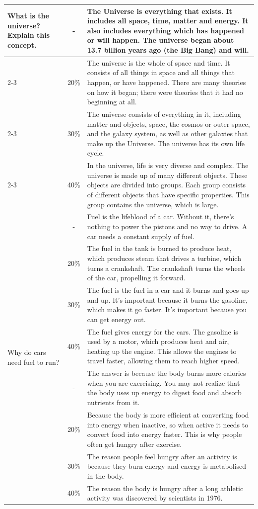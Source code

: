 \begin{table}[ht]
{\begin{tabular}{p{5cm}|c|p{8cm}}
\multirow{14}{=}{What is the universe? Explain this concept.}
& -   & The Universe is everything that exists. It includes all space, time, matter and energy. It also includes everything which has happened or will happen. The universe began about 13.7 billion years ago (the Big Bang) and will. \\
\cmidrule{2-3}
& 20\% & The universe is the whole of space and time. It consists of all things in space and all things that happen, or have happened. There are many theories on how it began; there were theories that it had no beginning at all. \\
\cmidrule{2-3}
& 30\% & The universe consists of everything in it, including matter and objects, space, the cosmos or outer space, and the galaxy system, as well as other galaxies that make up the Universe. The universe has its own life cycle. \\
\cmidrule{2-3}
& 40\% & In the universe, life is very diverse and complex. The universe is made up of many different objects. These objects are divided into groups. Each group consists of different objects that have specific properties. This group contains the universe, which is large. \\
\midrule

\multirow{11}{=}{Why do cars need fuel to run?}
& -   & Fuel is the lifeblood of a car. Without it, there's nothing to power
  the pistons and no way to drive. A car needs a constant supply of fuel. \\
\cmidrule{2-3}
& 20\% &  The fuel in the tank is burned to produce heat, which produces steam that drives a turbine, which turns a crankshaft. The crankshaft turns the wheels of the car, propelling it forward. \\
\cmidrule{2-3}
& 30\% & The fuel is the fuel in a car and it burns and goes up and up. It's important because it burns the gasoline, which makes it go faster. It's important because you can get energy out. \\
\cmidrule{2-3}
& 40\% & The fuel gives energy for the cars. The gasoline is used by a motor, which produces heat and air, heating up the engine. This allows the engines to travel faster, allowing them to reach higher speed. \\
\midrule

\multirow{9}{=}{Why do people feel hungry after exercise?}
& -   &  The answer is because the body burns more calories when you are exercising. You may not realize that the body uses up energy to digest food and absorb nutrients from it.  \\
\cmidrule{2-3}
& 20\% &  Because the body is more efficient at converting food into energy when inactive, so when active it needs to convert food into energy faster. This is why people often get hungry after exercise. \\
\cmidrule{2-3}
& 30\% & The reason people feel hungry after an activity is because they burn energy and energy is metabolised in the body.  \\
\cmidrule{2-3}
& 40\% & The reason the body is hungry after a long athletic activity was discovered by scientists in 1976. \\
\bottomrule


\end{tabular}}
\end{table}

